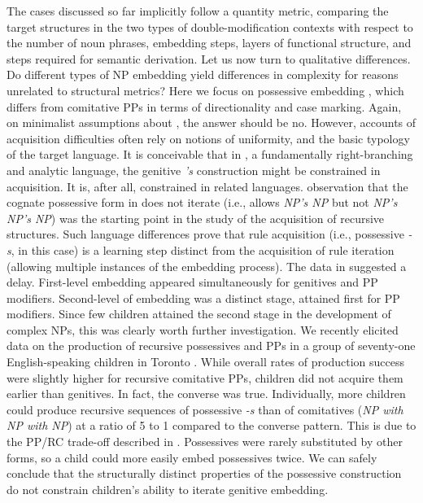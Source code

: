 \documentclass[output=paper]{langsci/langscibook}
\begin{document}
The cases discussed so far implicitly follow a quantity metric, comparing the
target structures in the two types of double-modification contexts with respect
to the number of noun phrases, embedding steps, layers of functional structure,
and steps required for semantic derivation. Let us now turn to qualitative
differences. Do different types of NP embedding yield differences in complexity
for reasons unrelated to structural metrics? Here we focus on possessive
embedding , which differs from comitative PPs  in
terms of directionality and case marking. Again, on minimalist assumptions
about , the answer should be no.  However, accounts of acquisition
difficulties often rely on notions of uniformity, and the basic typology of the
target language. It is conceivable that in , a fundamentally
right-branching and analytic language, the genitive \emph{'s}
construction might be constrained in acquisition. It is, after all, constrained
in related languages.  observation that the cognate
possessive form in  does not iterate (i.e.,  allows \emph{NP’s NP}
but not \emph{NP’s NP’s NP}) was the starting point in the study of the
acquisition of recursive  structures.  Such
language differences prove that rule acquisition
(i.e., possessive \emph{-s}, in this case) is a learning step distinct from the
acquisition of rule iteration (allowing multiple
instances of the embedding process).  The data in \citet{Perez-LerouxEtAl2012}
suggested a delay. First-level embedding appeared simultaneously for
genitives and PP modifiers. Second-level of embedding was a
distinct stage, attained first for PP modifiers. Since few children attained
the second stage in the development of complex NPs, this was clearly worth
further investigation.  We recently elicited data on the production of
recursive possessives and PPs in a group of seventy-one
English-speaking children in Toronto \parencite{Perez-LerouxEtAlinprep}. While
overall rates of production success were slightly higher for
recursive comitative PPs, children did not acquire them earlier
than genitives.  In fact, the converse was true.
Individually, more children could produce recursive sequences of
possessive \emph{-s} than of comitatives (\emph{NP with NP with NP}) at a ratio
of 5 to 1 compared to the converse pattern.  This is due to the PP/\gls{RC}
trade-off described in .  Possessives were rarely substituted by other
forms, so a child could more easily embed possessives twice. We can safely
conclude that the structurally distinct properties of the possessive
construction do not constrain children’s ability to iterate
genitive embedding.
\end{document}
